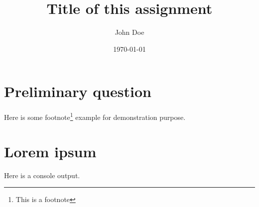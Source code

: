 \documentclass{assignment}
\title{Title of this assignment}
\author{John Doe}
\date{\today}
\begin{document}
\coverpage

\section*{Preliminary question}

\question{}
\blindtext
Here is some footnote\footnote{This is a footnote} example for demonstration purpose.

\section{Lorem ipsum}

\question{}
\blindtext

\blindtext

\begin{consoleOutput}
Here is a console output.
\end{consoleOutput}
\end{document}
